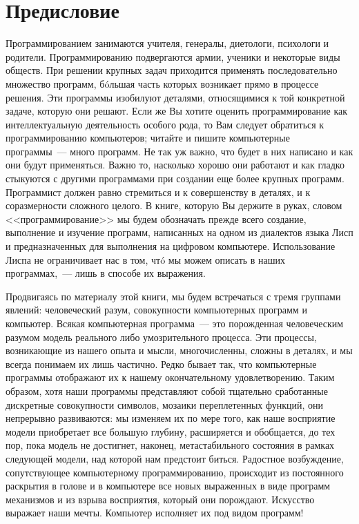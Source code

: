 \chapter*{Предисловие}
\thispagestyle{empty}

Программированием занимаются учителя, генералы, диетологи, психологи и родители.
Программированию подвергаются армии, ученики и некоторые виды обществ.
При решении крупных задач приходится применять последовательно множество
программ, б\'{o}льшая часть которых возникает прямо в процессе решения.
Эти программы изобилуют деталями, относящимися к той конкретной задаче,
которую они решают. Если же Вы хотите
оценить программирование как интеллектуальную деятельность особого
рода, то Вам следует обратиться к программированию компьютеров; читайте и пишите
компьютерные программы~--- много программ. Не так уж важно, что будет в них написано и
как они будут применяться.  Важно то,
насколько хорошо они работают и как гладко
стыкуются с другими программами при создании еще более крупных
программ. Программист должен равно стремиться и к совершенству в деталях, и
к соразмерности сложного целого. В книге, которую Вы держите в руках, словом <<программирование>>
мы будем обозначать прежде всего создание, выполнение и изучение программ,
написанных на одном из диалектов языка Лисп и предназначенных для выполнения на цифровом
компьютере. Использование Лиспа не ограничивает нас в том, чт\'{o} мы можем
описать в наших программах,~--- лишь в способе их выражения.

Продвигаясь по материалу этой книги, мы будем встречаться с тремя
группами явлений: человеческий разум, совокупности компьютерных программ и 
компьютер. Всякая компьютерная программа~--- это порожденная
человеческим разумом модель реального либо умозрительного
процесса. Эти процессы, возникающие из нашего опыта и мысли,
многочисленны, сложны в деталях, и мы всегда понимаем их лишь
частично.  Редко бывает так, что компьютерные программы
отображают их к нашему окончательному удовлетворению. Таким образом, хотя наши
программы представляют собой тщательно сработанные дискретные совокупности 
символов, мозаики переплетенных функций, они непрерывно развиваются: мы
изменяем их по мере того, как наше восприятие модели приобретает все
большую глубину, расширяется и обобщается, до тех пор, пока модель не достигнет,
наконец, метастабильного состояния в рамках следующей модели, над
которой нам предстоит биться.  Радостное возбуждение, сопутствующее
компьютерному программированию, происходит из постоянного раскрытия в
голове и в 
компьютере все новых выраженных в виде программ механизмов и из взрыва восприятия, 
который они порождают.  Искусство выражает наши мечты.
Компьютер исполняет их под видом программ!


